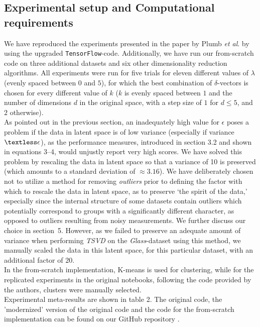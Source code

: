 \subsection{Experimental setup and Computational requirements}
We have reproduced the experiments presented in the paper by Plumb \textit{et al}. by using the upgraded \texttt{TensorFlow}-code. Additionally, we have run our from-scratch code on three additional datasets and six other dimensionality reduction algorithms. All experiments were run for five trials for eleven different values of $\lambda$ (evenly spaced between $0$ and $5$), for which the best combination of $\delta$-vectors is chosen for every different value of $k$ ($k$ is evenly spaced between $1$ and the number of dimensions $d$ in the original space, with a step size of $1$ for $d \leq 5$, and $2$ otherwise).\\
    
As pointed out in the previous section, an inadequately high value for $\epsilon$ poses a problem if the data in latent space is of low variance (especially if variance $\textless \epsilon$), as the performance measures, introduced in section 3.2 and shown in equations 3--4, would unjustly report very high scores. We have solved this problem by rescaling the data in latent space so that a variance of 10 is preserved (which amounts to a standard deviation of $\approx 3.16$). We have deliberately chosen not to utilize a method for removing \textit{outliers} prior to defining the factor with which to rescale the data in latent space, as to preserve `the spirit of the data,' especially since the internal structure of some datasets contain outliers which potentially correspond to groups with a significantly different character, as opposed to outliers resulting from noisy measurements. We further discuss our choice in section~5. However, as we failed to preserve an adequate amount of variance when performing \textit{TSVD} on the \textit{Glass}-dataset using this method, we manually scaled the data in this latent space, for this particular dataset, with an additional factor of $20$.\\

In the from-scratch implementation, K-means is used for clustering, while for the replicated experiments in the original notebooks, following the code provided by the authors, clusters were manually selected.\\

Experimental meta-results are shown in table 2. The original code, the 'modernized' version of the original code and the code for the from-scratch implementation can be found on our GitHub repository \cite{damiaan_j_w_reijnaers_2021_4686025}.

